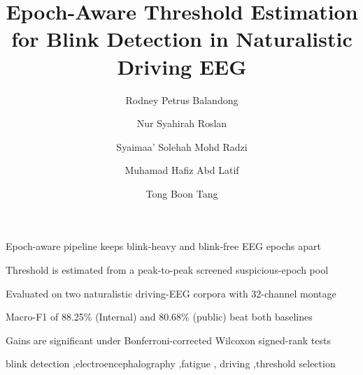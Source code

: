 \documentclass[preprint,review,12pt,number,sort&compress]{elsarticle}
\begin{document}
\begin{frontmatter}

\title{Epoch-Aware Threshold Estimation for Blink Detection in Naturalistic Driving EEG}

\author[ums]{Rodney Petrus Balandong}
\author[utar]{Nur Syahirah Roslan}
\author[cisir]{Syaimaa' Solehah Mohd Radzi}
\author[cisir]{Muhamad Hafiz Abd Latif}
\author[cisir]{Tong Boon Tang}










\begin{highlights}
\item Epoch-aware pipeline keeps blink-heavy and blink-free EEG epochs apart
\item Threshold is estimated from a peak-to-peak screened suspicious-epoch pool
\item Evaluated on two naturalistic driving-EEG corpora with 32-channel montage
\item Macro-F1 of 88.25\% (Internal) and 80.68\% (public) beat both baselines
\item Gains are significant under Bonferroni-corrected Wilcoxon signed-rank tests
\end{highlights}


\begin{keyword}
blink detection \sep electroencephalography \sep fatigue \sep
driving \sep threshold selection
\end{keyword}

\end{frontmatter}
\end{document}

